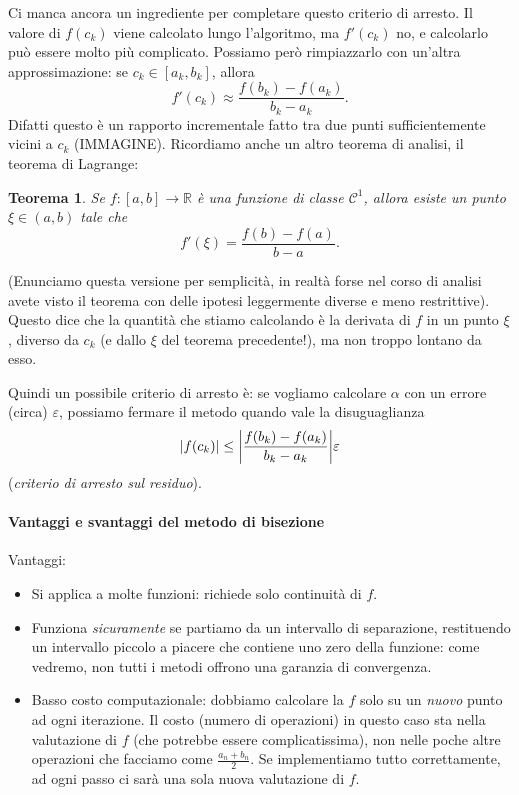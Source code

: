 \documentclass[a4paper]{report}
\DeclarePairedDelimiter{\abs}{\lvert}{\rvert}
\newtheorem{theorem}{Teorema}[chapter]
\theoremstyle{definiton}
\theoremstyle{remark}
\begin{document}
Ci manca ancora un ingrediente per completare questo criterio di arresto. Il valore di $f(c_k)$ viene calcolato lungo l'algoritmo, ma $f'(c_k)$ no, e calcolarlo può essere molto più complicato. Possiamo però rimpiazzarlo con un'altra approssimazione: se $c_k \in [a_k, b_k]$, allora
\[
f'(c_k) \approx \frac{f(b_k) - f(a_k)}{b_k - a_k}.
\]
Difatti questo è un rapporto incrementale fatto tra due punti sufficientemente vicini a $c_k$ (IMMAGINE). Ricordiamo anche un altro teorema di analisi, il teorema di Lagrange:
\begin{theorem}
    Se $f: [a,b] \to \mathbb{R}$ è una funzione di classe $\mathcal{C}^1$, allora esiste un punto $\xi \in (a,b)$ tale che
    \[
        f'(\xi) = \frac{f(b)-f(a)}{b-a}.
    \]
\end{theorem}
(Enunciamo questa versione per semplicità, in realtà forse nel corso di analisi avete visto il teorema con delle ipotesi leggermente diverse e meno restrittive). Questo dice che la quantità che stiamo calcolando è la derivata di $f$ in un punto $\xi$, diverso da $c_k$ (e dallo $\xi$ del teorema precedente!), ma non troppo lontano da esso.

Quindi un possibile criterio di arresto è: se vogliamo calcolare $\alpha$ con un errore (circa) $\varepsilon$, possiamo fermare il metodo quando vale la disuguaglianza 
\[
\abs{f(c_k)} \leq \abs*{\frac{f(b_k) - f(a_k)}{b_k-a_k}} \varepsilon
\]
(\emph{criterio di arresto sul residuo}).

\paragraph{Vantaggi e svantaggi del metodo di bisezione}

Vantaggi:

\begin{itemize}
    \item Si applica a molte funzioni: richiede solo continuità di $f$.
    \item Funziona \emph{sicuramente} se partiamo da un intervallo di separazione, restituendo un intervallo piccolo a piacere che contiene uno zero della funzione: come vedremo, non tutti i metodi offrono una garanzia di convergenza.
    \item Basso costo computazionale: dobbiamo calcolare la $f$ solo su un \emph{nuovo} punto ad ogni iterazione.
    Il costo (numero di operazioni) in questo caso sta nella valutazione di $f$ (che potrebbe essere complicatissima), non nelle poche altre operazioni che facciamo come $\frac{a_n + b_n}{2}$. Se implementiamo tutto correttamente, ad ogni passo ci sarà una sola nuova valutazione di $f$.
\end{itemize}
\end{document}
